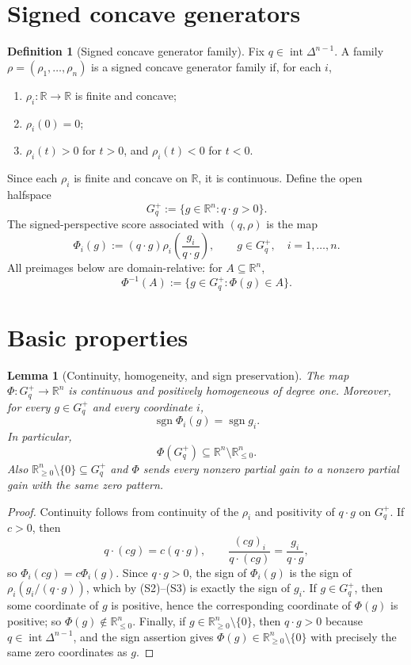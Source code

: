\documentclass[11pt]{article}
\theoremstyle{plain}
\newtheorem{lemma}[theorem]{Lemma}
\theoremstyle{definition}
\newtheorem{definition}[theorem]{Definition}
\theoremstyle{remark}
\DeclareMathOperator{\interior}{int}
\newcommand{\R}{\mathbb{R}}
\newcommand{\DeltaN}{\Delta^{n-1}}
\begin{document}
\section{Signed concave generators}

\begin{definition}[Signed concave generator family]
Fix $q\in\interior\DeltaN$. A family $\rho=(\rho_1,\ldots,\rho_n)$ is a signed concave generator family if, for each $i$,
\begin{enumerate}[label=(S\arabic*)]
\item $\rho_i:\R\to\R$ is finite and concave;
\item $\rho_i(0)=0$;
\item $\rho_i(t)>0$ for $t>0$, and $\rho_i(t)<0$ for $t<0$.
\end{enumerate}
\end{definition}

Since each $\rho_i$ is finite and concave on $\R$, it is continuous. Define the open halfspace
\[
G_q^+:=\{g\in\R^n:q\cdot g>0\}.
\]
The signed-perspective score associated with $(q,\rho)$ is the map
\[
\Phi_i(g):=(q\cdot g)\rho_i\!\left(\frac{g_i}{q\cdot g}\right),
\qquad g\in G_q^+,
\quad i=1,\ldots,n.
\]
All preimages below are domain-relative: for $A\subseteq\R^n$,
\[
\Phi^{-1}(A):=\{g\in G_q^+:\Phi(g)\in A\}.
\]

\section{Basic properties}

\begin{lemma}[Continuity, homogeneity, and sign preservation]
The map $\Phi:G_q^+\to\R^n$ is continuous and positively homogeneous of degree one. Moreover, for every $g\in G_q^+$ and every coordinate $i$,
\[
\operatorname{sgn}\Phi_i(g)=\operatorname{sgn}g_i.
\]
In particular,
\[
\Phi(G_q^+)\subseteq \R^n\setminus\R^n_{\le0}.
\]
Also $\R^n_{\ge0}\setminus\{0\}\subseteq G_q^+$ and $\Phi$ sends every nonzero partial gain to a nonzero partial gain with the same zero pattern.
\end{lemma}

\begin{proof}
Continuity follows from continuity of the $\rho_i$ and positivity of $q\cdot g$ on $G_q^+$. If $c>0$, then
\[
q\cdot(cg)=c(q\cdot g),
\qquad
\frac{(cg)_i}{q\cdot(cg)}=\frac{g_i}{q\cdot g},
\]
so $\Phi_i(cg)=c\Phi_i(g)$.
Since $q\cdot g>0$, the sign of $\Phi_i(g)$ is the sign of $\rho_i(g_i/(q\cdot g))$, which by (S2)--(S3) is exactly the sign of $g_i$. If $g\in G_q^+$, then some coordinate of $g$ is positive, hence the corresponding coordinate of $\Phi(g)$ is positive; so $\Phi(g)\notin\R^n_{\le0}$. Finally, if $g\in\R^n_{\ge0}\setminus\{0\}$, then $q\cdot g>0$ because $q\in\interior\DeltaN$, and the sign assertion gives $\Phi(g)\in\R^n_{\ge0}\setminus\{0\}$ with precisely the same zero coordinates as $g$.
\end{proof}
\end{document}
